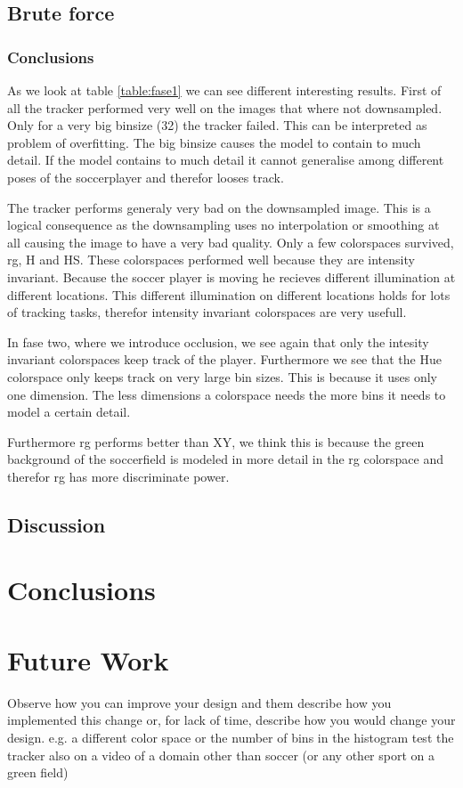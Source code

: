 \documentclass[a4paper,11pt]{article}
\begin{document}
	\subsection{Brute force} 
\subsubsection{Conclusions}
As we look at table \ref{table:fase1} we can see different interesting results.
First of all the tracker performed very well on the images that where not
downsampled. Only for a very big binsize (32) the tracker failed. This can be
interpreted as problem of overfitting. The big binsize causes the model to
contain to much detail. If the model contains to much detail it cannot
generalise among different poses of the soccerplayer and therefor looses track.

The tracker performs generaly very bad on the downsampled image. This is a
logical consequence as the downsampling uses no interpolation or smoothing at
all causing the image to have a very bad quality. Only a few colorspaces
survived, rg, H and HS. These colorspaces performed well because they are
intensity invariant. Because the soccer player is moving he recieves different
illumination at different locations. This different illumination on different
locations holds for lots of tracking tasks, therefor intensity
invariant colorspaces are very usefull.

In fase two, where we introduce occlusion, we see again that only the intesity
invariant colorspaces keep track of the player. Furthermore we see that the Hue
colorspace only keeps track on very large bin sizes. This is because it uses
only one dimension. The less dimensions a colorspace needs the more bins it
needs to model a certain detail.

Furthermore rg performs better than XY, we think this is because the green
background of the soccerfield is modeled in more detail in the rg colorspace and
therefor rg has more discriminate power.


\subsection{Discussion} %
\section{Conclusions} \label{sec:conc}
\section{Future Work} \label{sec:fut}
Observe how you can improve your design and them describe how you implemented this change or, for lack of time, describe how you would change your design. 
e.g. a different color space or the number of bins in the histogram
test the tracker also on a video of a domain other than soccer (or any other sport on a green field)
\end{document}
